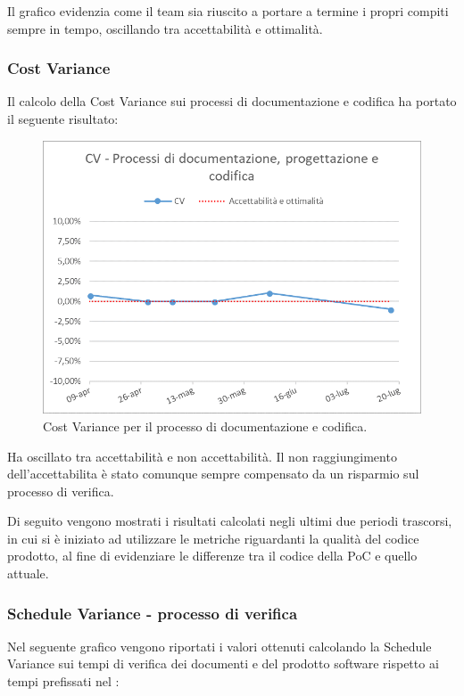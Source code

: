 Il grafico evidenzia come il team sia riuscito a portare a termine i propri compiti sempre in tempo, oscillando tra accettabilità e ottimalità.

\subsubsection{Cost Variance}
Il calcolo della Cost Variance sui processi di documentazione e codifica ha portato il seguente risultato: 

\begin{figure}[h!]
	\centering
	\includegraphics[scale=0.75]{img/Grafici/CV-cod_e_doc.png}
	\caption{Cost Variance per il processo di documentazione e codifica.}
	\label{fig:CV-Documenti}
\end{figure}

 Ha oscillato tra accettabilità e non accettabilità. Il non raggiungimento dell'accettabilita è stato comunque sempre compensato da un risparmio sul processo di verifica. 

\newpage
Di seguito vengono mostrati i risultati calcolati negli ultimi due periodi trascorsi, in cui si è iniziato ad utilizzare le metriche riguardanti la qualità del codice prodotto, al fine di evidenziare le differenze tra il codice della PoC e quello attuale.

\subsubsection{Schedule Variance - processo di verifica}
Nel seguente grafico vengono riportati i valori ottenuti calcolando la Schedule Variance sui tempi di verifica dei documenti e del prodotto software rispetto ai tempi prefissati nel \PdP{}:

